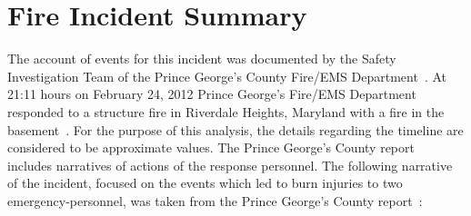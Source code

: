 \documentclass[12pt,oneside]{book}
\begin{document}
\chapter{Fire Incident Summary}
\label{fire_sum}
The account of events for this incident was documented by the Safety Investigation Team of the Prince George's County Fire/EMS Department~\cite{PGCounty2013}. At 21:11 hours on February 24, 2012 Prince George's Fire/EMS Department responded to a structure fire in Riverdale Heights, Maryland with a fire in the basement~\cite{PGCounty2013}. For the purpose of this analysis, the details regarding the timeline are considered to be approximate values. The Prince George's County report~\cite{PGCounty2013} includes narratives of actions of the response personnel. The following narrative of the incident, focused on the events which led to burn injuries to two emergency-personnel, was taken from the Prince George's County report~\cite{PGCounty2013}:
\end{document}
